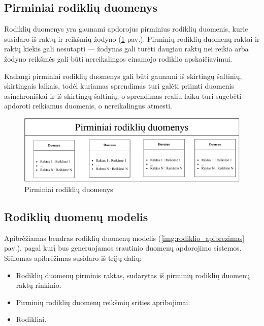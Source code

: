 \documentclass{VUMIFPSbakalaurinis}
\begin{document}
\subsection{Pirminiai rodiklių duomenys}

Rodiklių duomenys yra gaunami apdorojus pirminius rodiklių duomenis, kurie susidaro iš raktų ir reikšmių žodyno (\ref{img:duomenys} pav.). Pirminių rodiklių duomenų raktai ir raktų kiekis gali nesutapti — žodynas gali turėti daugiau raktų nei reikia arba žodyno reikšmės gali būti nereikalingos einamojo rodiklio apskaičiavimui. \par 
Kadangi pirminiai rodiklių duomenys gali būti gaunami iš skirtingų šaltinių, skirtingais laikais, todėl kuriamas sprendimas turi galėti priimti duomenis asinchroniškai ir iš skirtingų šaltinių, o sprendimas realiu laiku turi sugebėti apdoroti reikiamus duomenis, o nereikalingus atmesti. 

\begin{figure}[H]
    \centering
    \includegraphics[width=1\textwidth]{img/duomenys.pdf}
    \caption{Pirminiai rodiklių duomenys}
    \label{img:duomenys}
\end{figure}
\pagebreak
\subsection{Rodiklių duomenų modelis}

Apibrėžiamas bendras rodiklių duomenų modelis (\ref{img:rodiklio_apibrezimas} pav.), pagal kurį bus generuojamos srautinio duomenų apdorojimo sistemos. Siūlomas apibrėžimas susidaro iš trijų dalių: 
\begin{itemize}
    \item Rodiklių duomenų pirminis raktas, sudarytas iš pirminių rodiklių duomenų raktų rinkinio.
    \item Pirminių rodiklių duomenų reikšmių srities apribojimai.
    \item Rodikliai. 
\end{itemize}
\end{document}
